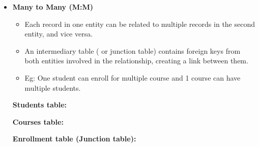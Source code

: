 \begin{flushleft}
\begin{itemize}
		\item \textbf{Many to Many (M:M)}
		\begin{itemize}
			\item Each record in one entity can be related to multiple records in the second entity, and vice versa.
			\item An intermediary table ( or junction table) contains foreign keys from both entities involved in the relationship, creating a link between them. 
			\item Eg: One student can enroll for multiple course and 1 course can have multiple students.
		\end{itemize}
	
		\textbf{Students table:}
	
		\textbf{Courses table:}
	
		\textbf{Enrollment table (Junction table):}
	
	\end{itemize}
	
\end{flushleft}

\newpage